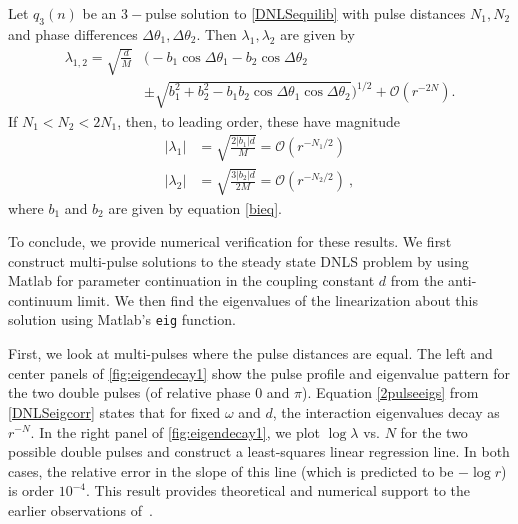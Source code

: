 \documentclass[thesis.tex]{subfiles}
\begin{document}
\begin{corollary}\label{DNLSeigcorr2}
Let $q_3(n)$ be an $3-$pulse solution to \cref{DNLSequilib} with pulse distances $N_1, N_2$ and phase differences $\Delta \theta_1, \Delta \theta_2$. Then $\lambda_1, \lambda_2$ are given by
\begin{equation}\label{3pulseeigs}
\begin{aligned}
\lambda_{1,2} = \sqrt{\frac{d}{M}}
&\Big( -b_1\cos\Delta\theta_1 - b_2\cos\Delta\theta_2  \\
&\pm \sqrt{b_1^2 + b_2^2 - b_1 b_2\cos\Delta\theta_1 \cos\Delta\theta_2} \Big)^{1/2} + \mathcal{O}(r^{-2N}).
\end{aligned}
\end{equation}
If $N_1 < N_2 < 2 N_1$, then, to leading order, these have magnitude
\begin{equation}\label{3pulsemag}
\begin{aligned}
|\lambda_1| &= \sqrt{\frac{2 |b_1| d}{M}} = \mathcal{O}(r^{-N_1/2}) \\
|\lambda_2| &= \sqrt{\frac{3 |b_2| d}{2 M}} = \mathcal{O}(r^{-N_2/2}) \:,
\end{aligned}
\end{equation}
where $b_1$ and $b_2$ are given by equation \cref{bieq}.
\end{corollary}

To conclude, we provide numerical verification for these results. We first construct multi-pulse solutions to the steady state DNLS problem by using Matlab for parameter continuation in the coupling constant $d$ from the anti-continuum limit. We then find the eigenvalues of the linearization about this solution using Matlab's \texttt{eig} function. 

First, we look at multi-pulses where the pulse distances are equal.  The left and center panels of \cref{fig:eigendecay1} show the pulse profile and eigenvalue pattern for the two double pulses (of relative phase $0$ and $\pi$). Equation \cref{2pulseeigs} from \cref{DNLSeigcorr} states that for fixed $\omega$ and $d$, the interaction eigenvalues decay as $r^{-N}$. In the right panel of \cref{fig:eigendecay1}, we plot $\log \lambda$ vs. $N$ for the two possible double pulses and construct a least-squares linear regression line. In both cases, the relative error in the slope of this line (which is predicted to be $-\log r$) is order $10^{-4}$. This result provides theoretical and numerical support to the earlier observations of~\cite{Kapitula2001a}.
\end{document}
